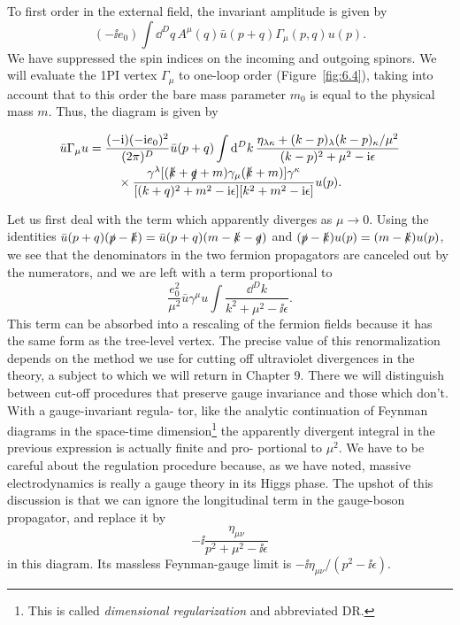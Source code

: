 To first order in the external field, the invariant amplitude is given by
\begin{equation*}
  (-\ii e_0)\int \dd^Dq\,A^\mu(q)\bar u(p+q)\Gamma_\mu(p,q)u(p).
\end{equation*}
We have suppressed the spin indices on the incoming and outgoing spinors. We will
evaluate the 1PI vertex $\Gamma_\mu$ to one-loop order (Figure~\ref{fig:6.4}), taking into account that
to this order the bare mass parameter $m_0$ is equal to the physical mass $m$. Thus, the
diagram is given by

\begin{equation*}
  \begin{aligned}
  \bar u\Gamma_\mu u
  ={}&\frac{(-\mathrm{i})(-\mathrm{i} e_0)^2}{(2\pi)^D}\bar u(p+q)\int \mathop{}\!\mathrm{d}^Dk\,
  \frac{\eta_{\lambda\kappa}+(k-p)_\lambda(k-p)_\kappa/\mu^2}
  {(k-p)^2+\mu^2-\mathrm{i}\epsilon}\\[-2pt]
  &\quad\times
  \frac{\gamma^\lambda[(\slashed k+\slashed q+m)\gamma_\mu(\slashed k+m)]\gamma^\kappa}
  {[(k+q)^2+m^2-\mathrm{i}\epsilon][k^2+m^2-\mathrm{i}\epsilon]}u(p).
  \end{aligned}
\end{equation*}

Let us first deal with the term which apparently diverges as $\mu\to0$. Using the
identities $\bar u(p+q)(\slashed p-\slashed k)=\bar u(p+q)(m-\slashed k-\slashed q)$ and
$(\slashed p-\slashed k)u(p)=(m-\slashed k)u(p)$,
we see that the denominators in the two fermion propagators are canceled out by the
numerators, and we are left with a term proportional to
\begin{equation*}
  \frac{e_0^2}{\mu^2}\bar u\gamma^\mu u\int\frac{\dd^Dk}{k^2+\mu^2-\ii\epsilon}.
\end{equation*}
This term can be absorbed into a rescaling of the fermion fields because it has the
same form as the tree-level vertex. The precise value of this renormalization depends
on the method we use for cutting off ultraviolet divergences in the theory, a subject to
which we will return in Chapter 9. There we will distinguish between cut-off procedures
that preserve gauge invariance and those which don’t. With a gauge-invariant regula-
tor, like the analytic continuation of Feynman diagrams in the space-time dimension\footnote[5]{This is called \emph{dimensional regularization} and abbreviated DR.}
the apparently divergent integral in the previous expression is actually finite and pro-
portional to $\mu^2$. We have to be careful about the regulation procedure because, as we
have noted, massive electrodynamics is really a gauge theory in its Higgs phase. The
upshot of this discussion is that we can ignore the longitudinal term in the gauge-boson
propagator, and replace it by
\begin{equation*}
  -\ii\frac{\eta_{\mu\nu}}{p^2+\mu^2-\ii\epsilon}
\end{equation*}
in this diagram.  Its massless Feynman-gauge limit is
\(-\ii\eta_{\mu\nu}/(p^2-\ii\epsilon)\).

